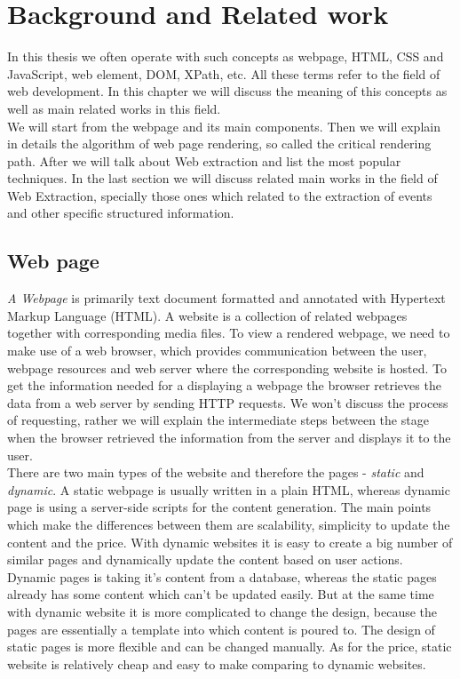 \chapter{Background and Related work}
\label{chap:background}

In this thesis we often operate with such concepts as webpage, HTML, CSS and JavaScript, web element, DOM, XPath, etc. All these terms refer to the field of web development. In this chapter we will discuss the meaning of this concepts as well as main related works in this field.\\

We will start from the webpage and its main components. Then we will explain in details the algorithm of web page rendering, so called the critical rendering path. After we will talk about Web extraction and list the most popular techniques. In the last section we will discuss related main works in the field of Web Extraction, specially those ones which related to the extraction of events and other specific structured information.\\

\section{Web page}
\textit{A Webpage} is primarily text document formatted and annotated with Hypertext Markup Language (HTML). A website is a collection of related webpages together with corresponding media files. To view a rendered webpage, we need to make use of a web browser, which provides communication between the user, webpage resources and web server where the corresponding website is hosted. To get the information needed for a displaying a webpage the browser retrieves the data from a web server by sending HTTP requests. We won't discuss the process of requesting, rather we will explain the intermediate steps between the stage when the browser retrieved the information from the server and displays it to the user.\\ 

There are two main types of the website and therefore the pages - \textit{static} and \textit{dynamic}. A static webpage is usually written in a plain HTML, whereas dynamic page is using a server-side scripts for the content generation. The main points which make the differences between them are scalability, simplicity to update the content and the price. With dynamic websites it is easy to create a big number of similar pages and dynamically update the content based on user actions. Dynamic pages is taking it's content from a database, whereas the static pages already has some content which can't be updated easily. But at the same time with dynamic website it is more complicated to change the design, because the pages are essentially a template into which content is poured to. The design of static pages is more flexible and can be changed manually. As for the price, static website is relatively cheap and easy to make comparing to dynamic websites.\\ 

